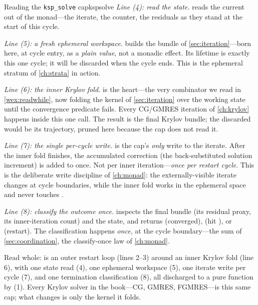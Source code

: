 \begin{workedexample}{Reading the \texttt{ksp\_solve} cap}{kspsolve}
\emph{Line (4): read the state.}  reads the current 
out of the monad---the iterate, the counter, the residuals as they stand at the
start of this cycle.

\emph{Line (5): a fresh ephemeral workspace.}  builds
the  bundle of \cref{sec:iteration}---born here, at cycle entry, as a
\emph{plain value}, not a monadic effect. Its lifetime is exactly this one cycle;
it will be discarded when the cycle ends. This is the ephemeral stratum of
\cref{ch:strata} in action.

\emph{Line (6): the inner Krylov fold.} 
is the heart---the very combinator we read in \cref{wex:readwhile}, now folding the
 kernel of \cref{sec:iteration} over the working state until the
convergence predicate  fails. Every CG/GMRES iteration of
\cref{ch:krylov} happens inside this one call. The result  is the final
Krylov bundle; the discarded  would be its trajectory, pruned here
because the cap does not read it.

\emph{Line (7): the single per-cycle  write.} 
is the cap's \emph{only} write to the iterate. After the inner fold finishes, the
accumulated correction  (the back-substituted
solution increment) is added to  once. Not per inner iteration---\emph{once
per restart cycle}. This is the deliberate write discipline of \cref{ch:monad}: the
externally-visible iterate changes at cycle boundaries, while the inner fold works
in the ephemeral  space and never touches .

\emph{Line (8): classify the outcome once.}  inspects the
final bundle (its residual proxy, its inner-iteration count) and the state, and
returns  (converged),  (hit ), or
 (restart). The classification happens \emph{once}, at the cycle
boundary---the  sum of \cref{sec:coordination}, the
classify-once law of \cref{ch:monad}.

Read whole:  is an outer restart loop (lines 2--3) around an inner
Krylov fold (line 6), with one state read (4), one ephemeral workspace (5), one
iterate write per cycle (7), and one termination classification (8), all discharged
to a pure function by  (1). Every Krylov solver in the book---CG,
GMRES, FGMRES---is this same cap; what changes is only the 
kernel it folds.
\end{workedexample}

